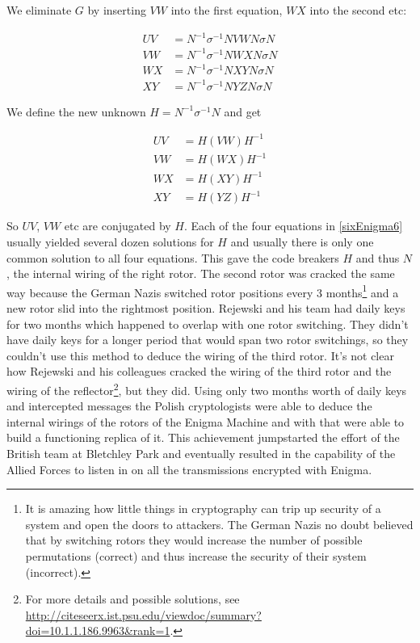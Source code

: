 We eliminate $G$ by inserting $VW$ into the first equation, $WX$ into the second etc:

\begin{equation} \label{sixEnigma5}
\begin{split}
U V &= N^{-1} \sigma^{-1} N V W N \sigma N \\
V W &= N^{-1} \sigma^{-1} N W X N \sigma N \\
W X &= N^{-1} \sigma^{-1} N X Y N \sigma N \\
X Y &= N^{-1} \sigma^{-1} N Y Z N \sigma N
\end{split}
\end{equation}

We define the new unknown $H = N^{-1} \sigma^{-1} N$ and get

\begin{equation} \label{sixEnigma6}
\begin{split}
U V &= H (V W) H^{-1} \\
V W &= H (W X) H^{-1} \\
W X &= H (X Y) H^{-1} \\
X Y &= H (Y Z) H^{-1}
\end{split}
\end{equation}

So $UV$, $VW$ etc are conjugated by $H$. Each of the four equations in \ref{sixEnigma6} usually yielded several dozen solutions for $H$ and usually there is only one common solution to all four equations. This gave the code breakers $H$ and thus $N$, the internal wiring of the right rotor. The second rotor was cracked the same way because the German Nazis switched rotor positions every 3 months\footnote{It is amazing how little things in cryptography can trip up security of a system and open the doors to attackers. The German Nazis no doubt believed that by switching rotors they would increase the number of possible permutations (correct) and thus increase the security of their system (incorrect).} and a new rotor slid into the rightmost position. Rejewski and his team had daily keys for two months which happened to overlap with one rotor switching. They didn't have daily keys for a longer period that would span two rotor switchings, so they couldn't use this method to deduce the wiring of the third rotor. It's not clear how Rejewski and his colleagues cracked the wiring of the third rotor and the wiring of the reflector\footnote{For more details and possible solutions, see  \url{http://citeseerx.ist.psu.edu/viewdoc/summary?doi=10.1.1.186.9963&rank=1}.}, but they did. Using only two months worth of daily keys and intercepted messages the Polish cryptologists were able to deduce the internal wirings of the rotors of the Enigma Machine and with that were able to build a functioning replica of it. This achievement jumpstarted the effort of the British team at Bletchley Park and eventually resulted in the capability of the Allied Forces to listen in on all the transmissions encrypted with Enigma.







